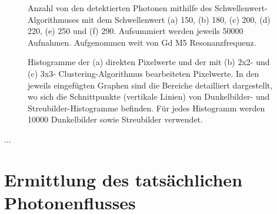 \begin{figure}[H]
    \centering
    
    \caption{Anzahl von den detektierten Photonen mithilfe des Schwellenwert-Algorithmuses mit dem Schwellenwert (a) \SI{150}{\adu}, (b) \SI{180}{\adu}, (c) \SI{200}{\adu}, (d) \SI{220}{\adu}, (e) \SI{250}{\adu} und (f) \SI{290}{\adu}. Aufsummiert werden jeweils \num{50000} Aufnahmen. Aufgenommen weit von Gd M5 Resonanzfrequenz.}
    \label{fig:cl_150_180_200_220_250_290_off_resonance}
\end{figure}
\begin{figure}[H]
    \centering
    
    \caption{Histogramme der (a) direkten Pixelwerte und der mit (b) 2x2- und (c) 3x3- Clustering-Algorithmus bearbeiteten Pixelwerte. In den jeweils eingefügten Graphen sind die Bereiche detailliert dargestellt, wo sich die Schnittpunkte (vertikale Linien) von Dunkelbilder- und Streubilder-Histogramme befinden. Für jedes Histogramm werden \num{10000} Dunkelbilder sowie Streubilder verwendet.}
    \label{fig:no_pr_cl_2_cl_3_histograms}
\end{figure}
...
\section{Ermittlung des tatsächlichen Photonenflusses}
\label{text:butterfly_counting}

